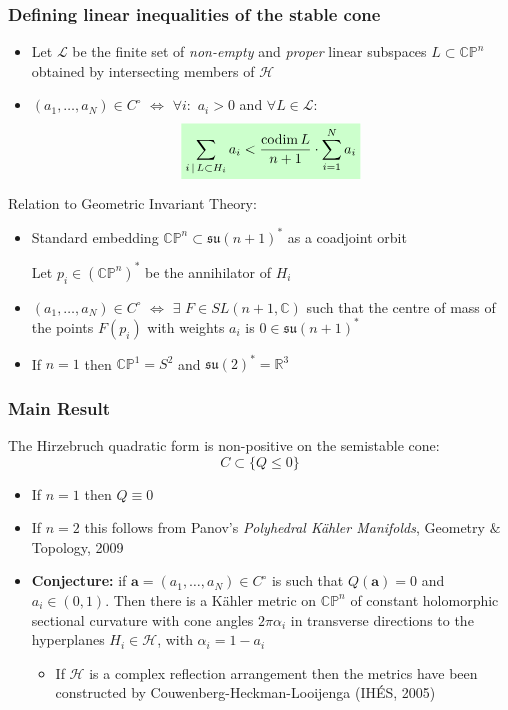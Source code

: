 \documentclass{beamer}
\newcommand{\C}{\mathbb{C}}
\newcommand{\R}{\mathbb{R}}
\newcommand{\CP}{\mathbb{CP}}
\newcommand{\mH}{\mathcal{H}}
\newcommand{\mL}{\mathcal{L}}
\newcommand{\ba}{\mathbf{a}}
\DeclareMathOperator{\codim}{codim}
\newcommand{\mathcolorbox}[2]{\colorbox{#1}{$\displaystyle #2$}}
\begin{document}
\begin{frame}
	\frametitle{Defining linear inequalities of the stable cone}
	\begin{itemize}
		\item Let \(\mL\) be the finite set of \emph{non-empty} and \emph{proper} linear subspaces \(L \subset \CP^n\) obtained by intersecting members of \(\mH\)
		
		\item \((a_1, \ldots, a_N) \in C^{\circ}\) \(\iff\) \(\forall i:\) \(a_i > 0\)  and \(\forall L \in \mL:\)
		\[
		\mathcolorbox{green!20}{
			\sum_{i \,|\, L \subset H_i} a_i < \frac{\codim L}{n+1} \cdot \sum_{i=1}^{N} a_i 
		}
		\]
	\end{itemize}

Relation to Geometric Invariant Theory:

\begin{itemize}
	\item Standard embedding \(\CP^n \subset \mathfrak{su}(n+1)^*\) as a coadjoint orbit
	
	Let \(p_i \in (\CP^n)^*\) be the annihilator of \(H_i\)
	
	\item \((a_1, \ldots, a_N) \in C^{\circ}\) \(\iff\) \(\exists\) \(F \in SL(n+1, \C)\) such that the centre of mass of the points \(F(p_i)\) with weights \(a_i\) is \(0 \in \mathfrak{su}(n+1)^*\)
	
	\item If \(n=1\) then \(\CP^1 = S^2\) and \(\mathfrak{su}(2)^* = \R^3\)
\end{itemize}
\end{frame}


\begin{frame}
	\frametitle{Main Result}
	\begin{theorem}
		The Hirzebruch quadratic form is non-positive on the semistable cone:
		\[
		C \subset \{Q \leq 0\}
		\]
	\end{theorem}

\begin{itemize}
	\item If \(n=1\) then \(Q \equiv 0\)
	\item If \(n=2\) this follows from Panov's \emph{Polyhedral K\"ahler Manifolds}, Geometry \(\&\) Topology, 2009
	\item \textbf{Conjecture:} if \(\ba = (a_1, \ldots, a_N) \in C^{\circ}\) is such that \(Q(\ba) = 0\) and  \(a_i \in (0,1)\). Then there is a K\"ahler metric on \(\CP^n\) of constant holomorphic sectional curvature with cone angles \(2\pi\alpha_i\) in transverse directions to the hyperplanes \(H_i \in \mH\), with \(\alpha_i = 1-a_i\)
	\begin{itemize}
		\item If \(\mH\) is a complex reflection arrangement then the metrics have been constructed by Couwenberg-Heckman-Looijenga (IH\'ES, 2005)
	\end{itemize}
\end{itemize}
\end{frame}
\end{document}
